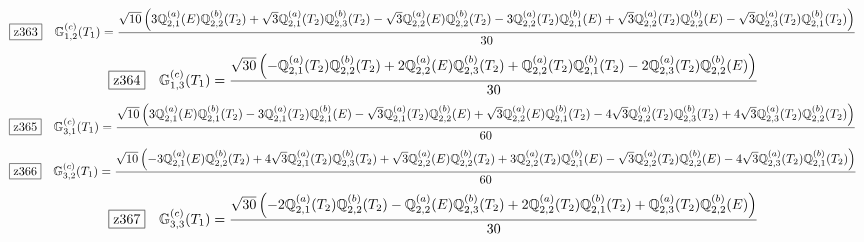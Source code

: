 \documentclass[fleqn,10pt,landscape]{jsarticle}
\begin{document}
\begin{dmath*}
\hspace*{3mm}\fbox{z363}\quad \mathbb{G}_{1,2}^{(c)}(T_{1})=\frac{\sqrt{10} \left(3 \mathbb{Q}_{2,1}^{(a)}(E) \mathbb{Q}_{2,2}^{(b)}(T_{2}) + \sqrt{3} \mathbb{Q}_{2,1}^{(a)}(T_{2}) \mathbb{Q}_{2,3}^{(b)}(T_{2}) - \sqrt{3} \mathbb{Q}_{2,2}^{(a)}(E) \mathbb{Q}_{2,2}^{(b)}(T_{2}) - 3 \mathbb{Q}_{2,2}^{(a)}(T_{2}) \mathbb{Q}_{2,1}^{(b)}(E) + \sqrt{3} \mathbb{Q}_{2,2}^{(a)}(T_{2}) \mathbb{Q}_{2,2}^{(b)}(E) - \sqrt{3} \mathbb{Q}_{2,3}^{(a)}(T_{2}) \mathbb{Q}_{2,1}^{(b)}(T_{2})\right)}{30}
\end{dmath*}
\begin{dmath*}
\hspace*{3mm}\fbox{z364}\quad \mathbb{G}_{1,3}^{(c)}(T_{1})=\frac{\sqrt{30} \left(- \mathbb{Q}_{2,1}^{(a)}(T_{2}) \mathbb{Q}_{2,2}^{(b)}(T_{2}) + 2 \mathbb{Q}_{2,2}^{(a)}(E) \mathbb{Q}_{2,3}^{(b)}(T_{2}) + \mathbb{Q}_{2,2}^{(a)}(T_{2}) \mathbb{Q}_{2,1}^{(b)}(T_{2}) - 2 \mathbb{Q}_{2,3}^{(a)}(T_{2}) \mathbb{Q}_{2,2}^{(b)}(E)\right)}{30}
\end{dmath*}
\begin{dmath*}
\hspace*{3mm}\fbox{z365}\quad \mathbb{G}_{3,1}^{(c)}(T_{1})=\frac{\sqrt{10} \left(3 \mathbb{Q}_{2,1}^{(a)}(E) \mathbb{Q}_{2,1}^{(b)}(T_{2}) - 3 \mathbb{Q}_{2,1}^{(a)}(T_{2}) \mathbb{Q}_{2,1}^{(b)}(E) - \sqrt{3} \mathbb{Q}_{2,1}^{(a)}(T_{2}) \mathbb{Q}_{2,2}^{(b)}(E) + \sqrt{3} \mathbb{Q}_{2,2}^{(a)}(E) \mathbb{Q}_{2,1}^{(b)}(T_{2}) - 4 \sqrt{3} \mathbb{Q}_{2,2}^{(a)}(T_{2}) \mathbb{Q}_{2,3}^{(b)}(T_{2}) + 4 \sqrt{3} \mathbb{Q}_{2,3}^{(a)}(T_{2}) \mathbb{Q}_{2,2}^{(b)}(T_{2})\right)}{60}
\end{dmath*}
\begin{dmath*}
\hspace*{3mm}\fbox{z366}\quad \mathbb{G}_{3,2}^{(c)}(T_{1})=\frac{\sqrt{10} \left(- 3 \mathbb{Q}_{2,1}^{(a)}(E) \mathbb{Q}_{2,2}^{(b)}(T_{2}) + 4 \sqrt{3} \mathbb{Q}_{2,1}^{(a)}(T_{2}) \mathbb{Q}_{2,3}^{(b)}(T_{2}) + \sqrt{3} \mathbb{Q}_{2,2}^{(a)}(E) \mathbb{Q}_{2,2}^{(b)}(T_{2}) + 3 \mathbb{Q}_{2,2}^{(a)}(T_{2}) \mathbb{Q}_{2,1}^{(b)}(E) - \sqrt{3} \mathbb{Q}_{2,2}^{(a)}(T_{2}) \mathbb{Q}_{2,2}^{(b)}(E) - 4 \sqrt{3} \mathbb{Q}_{2,3}^{(a)}(T_{2}) \mathbb{Q}_{2,1}^{(b)}(T_{2})\right)}{60}
\end{dmath*}
\begin{dmath*}
\hspace*{3mm}\fbox{z367}\quad \mathbb{G}_{3,3}^{(c)}(T_{1})=\frac{\sqrt{30} \left(- 2 \mathbb{Q}_{2,1}^{(a)}(T_{2}) \mathbb{Q}_{2,2}^{(b)}(T_{2}) - \mathbb{Q}_{2,2}^{(a)}(E) \mathbb{Q}_{2,3}^{(b)}(T_{2}) + 2 \mathbb{Q}_{2,2}^{(a)}(T_{2}) \mathbb{Q}_{2,1}^{(b)}(T_{2}) + \mathbb{Q}_{2,3}^{(a)}(T_{2}) \mathbb{Q}_{2,2}^{(b)}(E)\right)}{30}
\end{dmath*}
\end{document}
